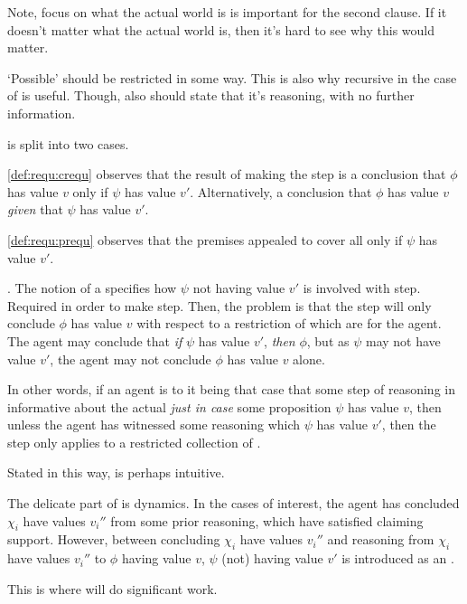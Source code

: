 \begin{note}
    \color{red}
    Note, focus on what the actual world is is important for the second clause.
    If it doesn't matter what the actual world is, then it's hard to see why this would matter.

    `Possible' should be restricted in some way.
    This is also why recursive in the case of \support{} is useful.
    Though, also should state that it's reasoning, with no further information.

    \requ{} is split into two cases.

    \ref{def:requ:crequ} observes that the result of making the step is a conclusion that \(\phi\) has value \(v\) only if \(\psi\) has value \(v'\).
    Alternatively, a conclusion that \(\phi\) has value \(v\) \emph{given} that \(\psi\) has value \(v'\).

    \ref{def:requ:prequ} observes that the premises appealed to cover all  only if \(\psi\) has value \(v'\).
\end{note}

\begin{note}
  \ideaCS{}.
  The notion of a \requ{} specifies how \(\psi\) not having value \(v'\) is involved with step.
  Required in order to make step.
  Then, the problem is that the step will only conclude \(\phi\) has value \(v\) with respect to a restriction of  which are \epVAd{} for the agent.
  The agent may conclude that \emph{if} \(\psi\) has value \(v'\), \emph{then} \(\phi\), but as \(\psi\) may not have value \(v'\), the agent may not conclude \(\phi\) has value \(v\) alone.

  In other words, if an agent is \committed{} to it being that case that some step of reasoning in informative about the actual \world{} \emph{just in case} some proposition \(\psi\) has value \(v\), then unless the agent has witnessed some reasoning which  \(\psi\) has value \(v'\), then the step only applies to a restricted collection of .
\end{note}

\begin{note}[Dynamics]
  Stated in this way, \ideaCS{} is perhaps intuitive.

  The delicate part of \ideaCS{} is dynamics.
  In the cases of interest, the agent has concluded \(\chi_{i}\) have values \(v_{i}''\) from some prior reasoning, which have satisfied claiming support.
  However, between concluding \(\chi_{i}\) have values \(v_{i}''\) and reasoning from \(\chi_{i}\) have values \(v_{i}''\) to \(\phi\) having value \(v\), \(\psi\) (not) having value \(v'\) is introduced as an \epVN{}.

  This is where \ideaCS{} will do significant work.
\end{note}

